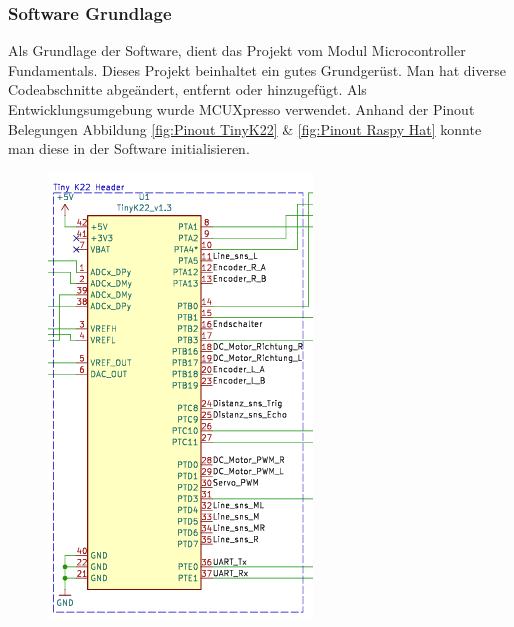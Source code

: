 \subsubsection{Software Grundlage}

Als Grundlage der Software, dient das Projekt vom Modul Microcontroller Fundamentals. Dieses Projekt beinhaltet ein gutes Grundgerüst. Man hat diverse Codeabschnitte abgeändert, entfernt oder hinzugefügt. Als Entwicklungsumgebung wurde MCUXpresso verwendet. Anhand der Pinout Belegungen Abbildung \ref{fig:Pinout TinyK22} \& \ref{fig:Pinout Raspy Hat} konnte man diese in der Software initialisieren.



\begin{figure}[h]
\centering
\begin{minipage}[b]{0.45\textwidth}
  \centering
  \includegraphics[width=\textwidth]{assets/ET/Software/Tiny_Pinout.png}

\end{minipage}
\end{figure}
